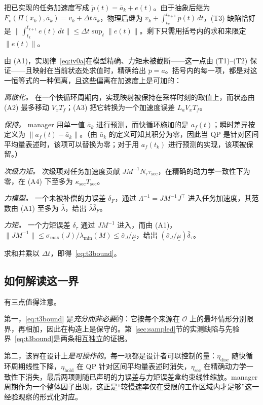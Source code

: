 \documentclass[journal]{IEEEtran}
\begin{document}
\begin{IEEEproof}
把已实现的任务加速度写成 $\ddot p(t)=\bar a_k+e(t)$。由于抽象后继为 $F_v(\Pi(x_k),\bar a_k)=v_k+\Delta t\,\bar a_k$，物理后继为 $v_k+\int_{t_k}^{t_{k+1}}\ddot p(t)\,dt$，(T3) 缺陷恰好是 $\bigl\|\int_{t_k}^{t_{k+1}}e(t)\,dt\bigr\|\le\Delta t\sup_t\|e(t)\|$。剩下只需用括号内的求和来限定 $\|e(t)\|$。

由 (A1)，实现律~\eqref{eq:iv0a}在模型精确、力矩未被截断——这一点由 (T1)--(T2) 保证——且映射在当前状态处求值时，精确给出 $\ddot p=a$。括号内的每一项，都是对这一恒等式的一种偏离，且这些偏离在加速度上是可加的：

\emph{离散化。} 在一个快循环周期内，实现映射被保持在采样时刻的取值上，而状态由 (A2) 最多移动 $V_xT_f$；(A3) 把它转换为一个加速度误差 $L_aV_xT_f$。

\emph{保持。} manager 用单一值 $\bar a_k$ 进行预测，而快循环施加的是 $a_f(t)$；瞬时差异按定义为 $\|a_f(t)-\bar a_k\|$。（由 $\bar a_k$ 的定义可知其积分为零，因此当 QP 是针对区间平均量表述时，该项可以替换为零；对于用 $a_f(t_k)$ 进行预测的实现，该项被保留。）

\emph{次级力矩。} 次级项对任务加速度贡献 $JM^{-1}N_\tau\tau_{\mathrm{sec}}$，在精确的动力学一致性下为零，在 (A4) 下至多为 $\kappa_{\mathrm{sec}}T_{\mathrm{sec}}$。

\emph{力模型。} 一个未被补偿的力误差 $\delta_F$，通过 $\Lambda^{-1}=JM^{-1}J^\top$ 进入任务加速度，其范数由 (A1) 至多为 $\bar\lambda$，给出 $\bar\lambda\bar\delta_F$。

\emph{力矩。} 一个力矩误差 $\delta_\tau$ 通过 $JM^{-1}$ 进入，而由 (A1)，$\|JM^{-1}\|\le\sigma_{\max}(J)/\lambda_{\min}(M)\le\bar\sigma_J/\underline\mu$，给出 $(\bar\sigma_J/\underline\mu)\bar\delta_\tau$。

求和并乘以 $\Delta t$，即得~\eqref{eq:t3bound}。
\end{IEEEproof}

\subsection{如何解读这一界}

有三点值得注意。

第一，\eqref{eq:t3bound} 是\emph{充分而非必要}的：它按每个来源在 $\mathcal O$ 上的最坏情形分别限界，再相加，因此在构造上是保守的。第~\ref{sec:sampled}节的实测缺陷与先验界~\eqref{eq:t3bound}是两条相互独立的证据。

第二，该界在设计上\emph{是可操作的}。每一项都是设计者可以控制的量：$\eta_{\mathrm{disc}}$ 随快循环周期线性下降，$\eta_{\mathrm{hold}}$ 在 QP 针对区间平均量表述时消失，$\eta_{\mathrm{sec}}$ 在精确动力学一致性下消失，最后两项则随已声明的力误差与力矩误差盒约束线性缩放。manager 周期作为一个整体因子出现，这正是“较慢速率仅在受限的工作区域内才足够”这一经验观察的形式化对应。
\end{document}
